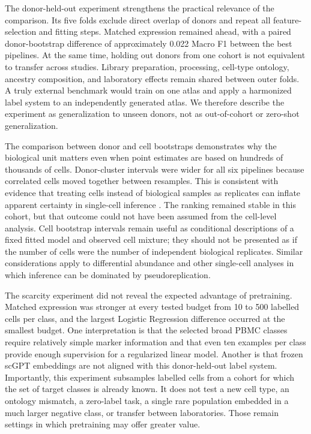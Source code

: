 The donor-held-out experiment strengthens the practical relevance of the comparison. Its five folds exclude direct overlap of donors and repeat all feature-selection and fitting steps. Matched expression remained ahead, with a paired donor-bootstrap difference of approximately 0.022 Macro F1 between the best pipelines. At the same time, holding out donors from one cohort is not equivalent to transfer across studies. Library preparation, processing, cell-type ontology, ancestry composition, and laboratory effects remain shared between outer folds. A truly external benchmark would train on one atlas and apply a harmonized label system to an independently generated atlas. We therefore describe the experiment as generalization to unseen donors, not as out-of-cohort or zero-shot generalization.

The comparison between donor and cell bootstraps demonstrates why the biological unit matters even when point estimates are based on hundreds of thousands of cells. Donor-cluster intervals were wider for all six pipelines because correlated cells moved together between resamples. This is consistent with evidence that treating cells instead of biological samples as replicates can inflate apparent certainty in single-cell inference \citep{Squair2021}. The ranking remained stable in this cohort, but that outcome could not have been assumed from the cell-level analysis. Cell bootstrap intervals remain useful as conditional descriptions of a fixed fitted model and observed cell mixture; they should not be presented as if the number of cells were the number of independent biological replicates. Similar considerations apply to differential abundance and other single-cell analyses in which inference can be dominated by pseudoreplication.

The scarcity experiment did not reveal the expected advantage of pretraining. Matched expression was stronger at every tested budget from 10 to 500 labelled cells per class, and the largest Logistic Regression difference occurred at the smallest budget. One interpretation is that the selected broad PBMC classes require relatively simple marker information and that even ten examples per class provide enough supervision for a regularized linear model. Another is that frozen scGPT embeddings are not aligned with this donor-held-out label system. Importantly, this experiment subsamples labelled cells from a cohort for which the set of target classes is already known. It does not test a new cell type, an ontology mismatch, a zero-label task, a single rare population embedded in a much larger negative class, or transfer between laboratories. Those remain settings in which pretraining may offer greater value.

